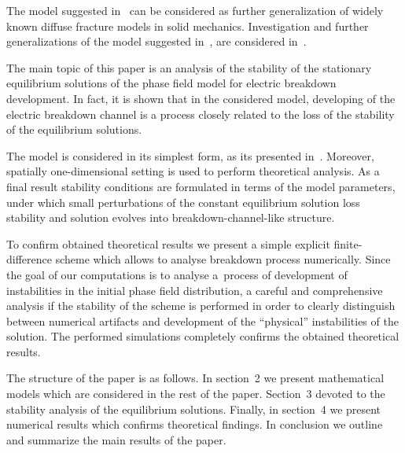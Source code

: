 The model suggested
in~\cite{pitike_dielectric_breakdown}
can be considered as further generalization of widely known diffuse
fracture models in solid mechanics.
Investigation and further generalizations of the model suggested
in~\cite{pitike_dielectric_breakdown},
are considered in~\cite{zipunova_higher_codimension, zipunova_conservative,
zipunova_thermomechanical}.

The main topic of this paper is an analysis of the stability of the
stationary equilibrium solutions of the phase field model for
electric breakdown development.
In fact, it is shown that in the considered model,
developing of the electric breakdown channel is a process
closely related to the loss of the stability of the equilibrium
solutions.

The model is considered in its simplest form, as its presented
in~\cite{pitike_dielectric_breakdown}.
Moreover, spatially one-dimensional setting is used to perform
theoretical analysis. As a final result stability conditions are
formulated in terms of the model parameters, under which small perturbations of the constant
equilibrium solution loss stability and solution evolves into
breakdown-channel-like structure.

To confirm obtained theoretical results we present a simple explicit
finite-difference scheme which allows to analyse breakdown process
numerically. Since the goal of our computations is to analyse
a~process
of development of instabilities in the initial phase field
distribution,
a careful and comprehensive analysis if the stability of the scheme is
performed in order to clearly distinguish between numerical artifacts and
development of the ``physical'' instabilities of the solution.
The performed simulations completely confirms the obtained theoretical
results.

The structure of the paper is as follows.
In section~2 we present mathematical models which are considered in
the rest of the paper. Section~3 devoted to the stability analysis of
the equilibrium solutions. Finally, in section~4 we present numerical
results which confirms theoretical findings.
In conclusion we outline and summarize the main results of the paper.

\endinput

